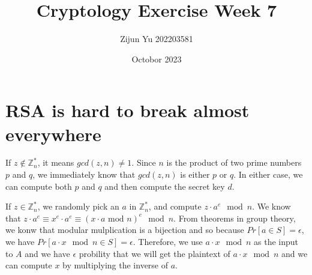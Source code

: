 \documentclass{article}
\title{Cryptology Exercise Week 7}
\author{Zijun Yu 202203581}
\date{Octobor 2023}
\begin{document}
\maketitle

\section*{RSA is hard to break almost everywhere}

If $z \notin \mathbb{Z}_n^*$, it means $gcd(z, n) \neq 1$. Since $n$ is the product of
two prime numbers $p$ and $q$, we immediately know that $gcd(z, n)$ is either $p$ or $q$.
In either case, we can compute both $p$ and $q$ and then compute the secret key $d$.

If $z \in \mathbb{Z}_n^*$, we randomly pick an $a$ in $\mathbb{Z}_n^*$, and compute
$z \cdot a^e \mod n$. We know that $z \cdot a ^ e \equiv x^e \cdot a^e \equiv (x \cdot a \text{ mod } n)^e \mod n$.
From theorems in group theory, we konw that modular mulplication is a bijection and so because $Pr[a \in S] = \epsilon$,
we have $Pr[a \cdot x \mod n \in S] = \epsilon$. Therefore, we use $a \cdot x \mod n$ as the input to $A$ and
we have $\epsilon$ probility that we will get the plaintext of $a \cdot x \mod n$ and we can compute $x$
by multiplying the inverse of $a$.
\end{document}
